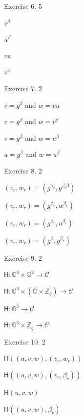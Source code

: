 \documentclass[../../book.tex]{subfiles}
\begin{document}
\begin{xexercise}
    {Exercise 6.}
    {}
    {5}
    {
        \item $v^{\beta}$
        \item $u^{\beta}$
        \item $vu$
        \item $v^u$
    }
\end{xexercise}

\begin{xexercise}
    {Exercise 7.}
    {}
    {2}
    {
        \item $v = g^{\beta}$ and $w = vu$
        \item $v = g^{\beta}$ and $w = v^{\beta}$
        \item $v = g^{\beta}$ and $w = u^{\beta}$
        \item $u = g^{\beta}$ and $w = u^{\beta}$
    }
\end{xexercise}

\begin{xexercise}
    {Exercise 8.}
    {}
    {2}
    {
        \item $(v_r,w_r) = (g^{\beta_r},g^{\beta_r\beta})$
        \item $(v_r,w_r) = (g^{\beta_r},w^{\beta_r})$
        \item $(v_r,w_r) = (g^{\beta_r},u^{\beta_r})$
        \item $(v_r,w_r) = (g^{\beta},g^{\beta_r})$
    }
\end{xexercise}

\begin{xexercise}
    {Exercise 9.}
    {}
    {2}
    {
        \item $\mathsf{H}: \mathbb{G}^3 \times \mathbb{G}^2 \to \mathcal{C}$
        \item $\mathsf{H}: \mathbb{G}^3 \times (\mathbb{G} \times \mathbb{Z}_q) \to \mathcal{C}$
        \item $\mathsf{H}: \mathbb{G}^3 \to \mathcal{C}$
        \item $\mathsf{H}: \mathbb{G}^3 \times \mathbb{Z}_q \to \mathcal{C}$
    }
\end{xexercise}

\begin{xexercise}
    {Exercise 10.}
    {}
    {2}
    {
        \item $\mathsf{H}((u,v,w),(v_r,w_r))$
        \item $\mathsf{H}((u,v,w),(v_r,\beta_r))$
        \item $\mathsf{H}(u,v,w)$
        \item $\mathsf{H}((u,v,w),\beta_r)$
    }
\end{xexercise}
\end{document}
